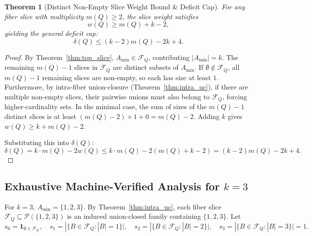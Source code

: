 \documentclass[11pt,a4paper]{article}
\theoremstyle{plain}
\newtheorem{theorem}{Theorem}[section]
\theoremstyle{definition}
\theoremstyle{remark}
\newcommand{\F}{\mathcal{F}}
\begin{document}
\begin{theorem}[Distinct Non-Empty Slice Weight Bound \& Deficit Cap]\label{thm:distinct_slice_bound}
For any fiber slice with multiplicity $m(Q) \ge 2$, the slice weight satisfies
\begin{equation}
w(Q) \ge m(Q) + k - 2,
\end{equation}
yielding the general deficit cap:
\begin{equation}
\delta(Q) \le (k - 2) m(Q) - 2k + 4.
\end{equation}
\end{theorem}
\begin{proof}
By Theorem~\ref{thm:top_slice}, $A_{\min} \in \F_Q$, contributing $|A_{\min}| = k$. The remaining $m(Q) - 1$ slices in $\F_Q$ are distinct subsets of $A_{\min}$. If $\emptyset \notin \F_Q$, all $m(Q) - 1$ remaining slices are non-empty, so each has size at least $1$. Furthermore, by intra-fiber union-closure (Theorem~\ref{thm:intra_uc}), if there are multiple non-empty slices, their pairwise unions must also belong to $\F_Q$, forcing higher-cardinality sets. In the minimal case, the sum of sizes of the $m(Q) - 1$ distinct slices is at least $(m(Q) - 2) \times 1 + 0 = m(Q) - 2$. Adding $k$ gives $w(Q) \ge k + m(Q) - 2$.

Substituting this into $\delta(Q)$:
\begin{equation}
\delta(Q) = k \cdot m(Q) - 2 w(Q) \le k \cdot m(Q) - 2(m(Q) + k - 2) = (k - 2)m(Q) - 2k + 4.
\end{equation}
\end{proof}

\subsection{Exhaustive Machine-Verified Analysis for $k=3$}

For $k = 3$, $A_{\min} = \{1, 2, 3\}$. By Theorem~\ref{thm:intra_uc}, each fiber slice $\F_Q \subseteq \mathcal{P}(\{1, 2, 3\})$ is an induced union-closed family containing $\{1, 2, 3\}$. Let
\begin{equation}
s_0 = \mathbf{1}_{\emptyset \in \F_Q}, \quad s_1 = |\{B \in \F_Q : |B| = 1\}|, \quad s_2 = |\{B \in \F_Q : |B| = 2\}|, \quad s_3 = |\{B \in \F_Q : |B| = 3\}| = 1.
\end{equation}
\end{document}
